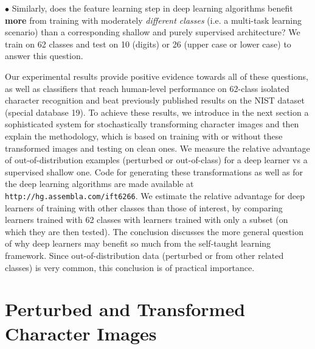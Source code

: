 \documentclass[smallcondensed]{svjour3}     %
\begin{document}
$\bullet$ %
Similarly, does the feature learning step in deep learning algorithms benefit {\bf more}
from training with moderately {\em different classes} (i.e. a multi-task learning scenario) than
a corresponding shallow and purely supervised architecture?
We train on 62 classes and test on 10 (digits) or 26 (upper case or lower case)
to answer this question.

Our experimental results provide positive evidence towards all of these questions,
as well as classifiers that reach human-level performance on 62-class isolated character
recognition and beat previously published results on the NIST dataset (special database 19).
To achieve these results, we introduce in the next section a sophisticated system
for stochastically transforming character images and then explain the methodology,
which is based on training with or without these transformed images and testing on 
clean ones. We measure the relative advantage of out-of-distribution examples
(perturbed or out-of-class)
for a deep learner vs a supervised shallow one.
Code for generating these transformations as well as for the deep learning 
algorithms are made available at {\tt http://hg.assembla.com/ift6266}.
We estimate the relative advantage for deep learners of training with
other classes than those of interest, by comparing learners trained with
62 classes with learners trained with only a subset (on which they
are then tested).
The conclusion discusses
the more general question of why deep learners may benefit so much from 
the self-taught learning framework. Since out-of-distribution data
(perturbed or from other related classes) is very common, this conclusion
is of practical importance.

\section{Perturbed and Transformed Character Images}
\label{s:perturbations}
\end{document}
